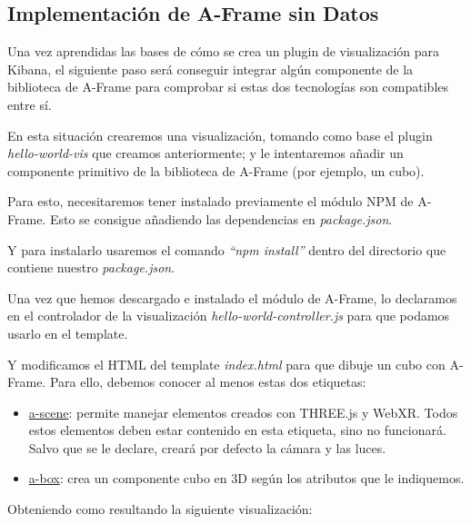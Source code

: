 \documentclass[a4paper, 12pt]{book}
\begin{document}
\subsection{Implementación de A-Frame sin Datos}
\label{sec:aframesindatos}

Una vez aprendidas las bases de cómo se crea un plugin de visualización para Kibana, el siguiente paso será conseguir integrar algún componente de la biblioteca de A-Frame para comprobar si estas dos tecnologías son compatibles entre sí.

En esta situación crearemos una visualización, tomando como base el plugin \textit{hello-world-vis} que creamos anteriormente; y le intentaremos añadir un componente primitivo de la biblioteca de A-Frame (por ejemplo, un cubo).

Para esto, necesitaremos tener instalado previamente el módulo NPM de A-Frame. Esto se consigue añadiendo las dependencias en \textit{package.json}.



Y  para instalarlo usaremos el comando \textit{“npm install”} dentro del directorio que contiene nuestro \textit{package.json}.

Una vez que hemos descargado e instalado el módulo de A-Frame, lo declaramos en el controlador de la visualización \textit{hello-world-controller.js} para que podamos usarlo en el template.



Y modificamos el HTML del template \textit{index.html} para que dibuje un cubo con A-Frame. Para ello, debemos conocer al menos estas dos etiquetas: 

\begin{itemize}
    \item \underline{a-scene}: permite manejar elementos creados con THREE.js y WebXR. Todos estos elementos deben estar contenido en esta etiqueta, sino no funcionará. Salvo que se le declare, creará por defecto la cámara y las luces.
    \item \underline{a-box}: crea un componente cubo en 3D según los atributos que le indiquemos.
\end{itemize}



Obteniendo como resultando la siguiente visualización:
\end{document}
